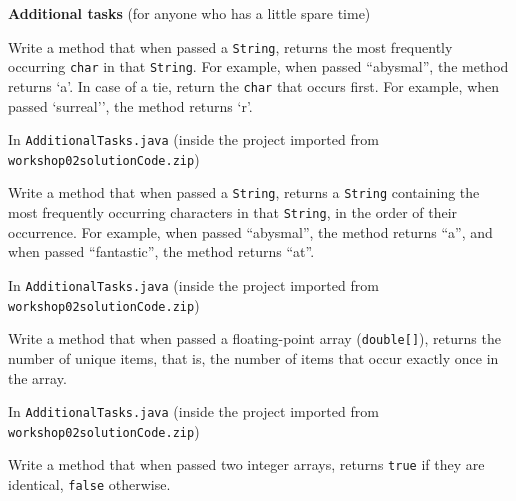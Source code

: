 \begin{questions}
\newpage

\textbf{Additional tasks} (for anyone who has a little spare time)

\question Write a method that when passed a \texttt{String}, returns the most frequently occurring \texttt{char} in that \texttt{String}. For example, when passed ``abysmal'', the method returns `a'. In case of a tie, return the \texttt{char} that occurs first. For example, when passed `surreal'', the method returns `r'.

\begin{solution}
In \texttt{AdditionalTasks.java} \newline
(inside the project imported from  \texttt{workshop02solutionCode.zip})
\end{solution}

\question Write a method that when passed a \texttt{String}, returns a \texttt{String} containing the most frequently occurring characters in that \texttt{String}, in the order of their occurrence. For example, when passed ``abysmal'', the method returns ``a'', and when passed ``fantastic'', the method returns ``at''.

\begin{solution}
In \texttt{AdditionalTasks.java} \newline
(inside the project imported from  \texttt{workshop02solutionCode.zip})
\end{solution}

\question Write a method that when passed a floating-point array (\texttt{double[]}), returns the number of unique items, that is, the number of items that occur exactly once in the array.

\begin{solution}
In \texttt{AdditionalTasks.java} \newline
(inside the project imported from  \texttt{workshop02solutionCode.zip})
\end{solution}

\question Write a method that when passed two integer arrays, returns \texttt{true} if they are identical, \texttt{false} otherwise.
\end{questions}

